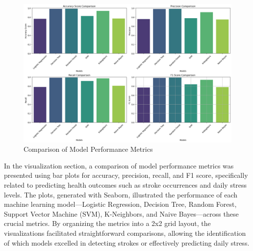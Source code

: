 \documentclass[runningheads]{llncs}
\begin{document}
\begin{enumerate}
\begin{figure}
    \centering
    \includegraphics[width=1.0\linewidth]{modeling 1.png}
    \caption{Comparison of Model Performance Metrics} 
    \label{fig:enter-label}
\end{figure}

In the visualization section, a comparison of model performance metrics was presented using bar plots for accuracy, precision, recall, and F1 score, specifically related to predicting health outcomes such as stroke occurrences and daily stress levels. The plots, generated with Seaborn, illustrated the performance of each machine learning model—Logistic Regression, Decision Tree, Random Forest, Support Vector Machine (SVM), K-Neighbors, and Naive Bayes—across these crucial metrics. By organizing the metrics into a 2x2 grid layout, the visualizations facilitated straightforward comparisons, allowing the identification of which models excelled in detecting strokes or effectively predicting daily stress. 


\end{enumerate}
\end{document}
